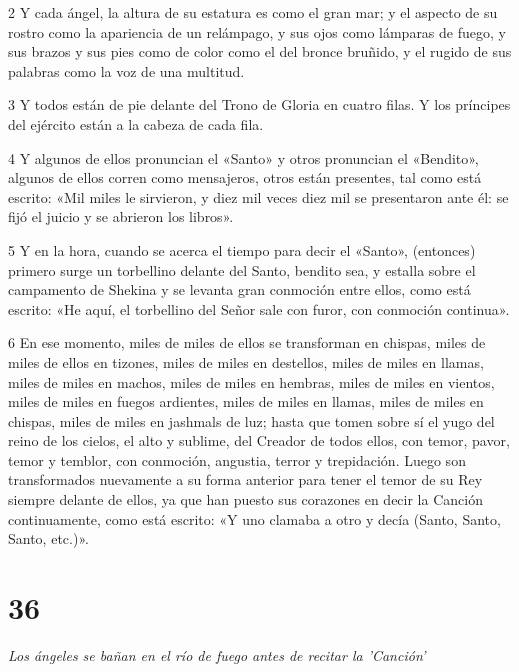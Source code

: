 \par 2 Y cada ángel, la altura de su estatura es como el gran mar; y el aspecto de su rostro como la apariencia de un relámpago, y sus ojos como lámparas de fuego, y sus brazos y sus pies como de color como el del bronce bruñido, y el rugido de sus palabras como la voz de una multitud.

\par 3 Y todos están de pie delante del Trono de Gloria en cuatro filas. Y los príncipes del ejército están a la cabeza de cada fila.

\par 4 Y algunos de ellos pronuncian el «Santo» y otros pronuncian el «Bendito», algunos de ellos corren como mensajeros, otros están presentes, tal como está escrito: «Mil miles le sirvieron, y diez mil veces diez mil se presentaron ante él: se fijó el juicio y se abrieron los libros».

\par 5 Y en la hora, cuando se acerca el tiempo para decir el «Santo», (entonces) primero surge un torbellino delante del Santo, bendito sea, y estalla sobre el campamento de Shekina y se levanta gran conmoción entre ellos, como está escrito: «He aquí, el torbellino del Señor sale con furor, con conmoción continua».

\par 6 En ese momento, miles de miles de ellos se transforman en chispas, miles de miles de ellos en tizones, miles de miles en destellos, miles de miles en llamas, miles de miles en machos, miles de miles en hembras, miles de miles en vientos, miles de miles en fuegos ardientes, miles de miles en llamas, miles de miles en chispas, miles de miles en jashmals de luz; hasta que tomen sobre sí el yugo del reino de los cielos, el alto y sublime, del Creador de todos ellos, con temor, pavor, temor y temblor, con conmoción, angustia, terror y trepidación. Luego son transformados nuevamente a su forma anterior para tener el temor de su Rey siempre delante de ellos, ya que han puesto sus corazones en decir la Canción continuamente, como está escrito: «Y uno clamaba a otro y decía (Santo, Santo, Santo, etc.)».


\chapter{36}

\par \textit{Los ángeles se bañan en el río de fuego antes de recitar la 'Canción'}

